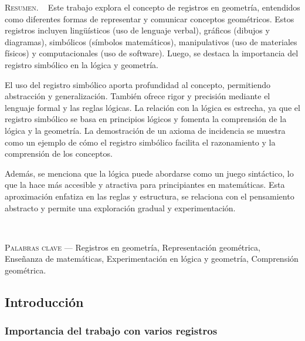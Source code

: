 \begin{center}
	\begin{minipage}{0.75\linewidth} \small
		\textsc{Resumen}. ~
		Este trabajo explora el concepto de registros en geometría, entendidos como diferentes formas de representar y comunicar conceptos geométricos. Estos registros incluyen lingüísticos (uso de lenguaje verbal), gráficos (dibujos y diagramas), simbólicos (símbolos matemáticos), manipulativos (uso de materiales físicos) y computacionales (uso de software). Luego, se destaca la importancia del registro simbólico en la lógica y geometría.
		
		El uso del registro simbólico aporta profundidad al concepto, permitiendo abstracción y generalización. También ofrece rigor y precisión mediante el lenguaje formal y las reglas lógicas. La relación con la lógica es estrecha, ya que el registro simbólico se basa en principios lógicos y fomenta la comprensión de la lógica y la geometría. La demostración de un axioma de incidencia se muestra como un ejemplo de cómo el registro simbólico facilita el razonamiento y la comprensión de los conceptos.
		
		Además, se menciona que la lógica puede abordarse como un juego sintáctico, lo que la hace más accesible y atractiva para principiantes en matemáticas. Esta aproximación enfatiza en las reglas y estructura, se relaciona con el pensamiento abstracto y permite una exploración gradual y experimentación.
	\end{minipage}\\
	
	\vspace{0.5em}
	
	\begin{minipage}{0.75\linewidth} \small
	\textsc{Palabras clave} --- Registros en geometría, Representación geométrica, Enseñanza de matemáticas, Experimentación en lógica y geometría, Comprensión geométrica.
	\end{minipage}
\end{center}

\subsection{Introducción}

\subsubsection{Importancia del trabajo con varios registros}

